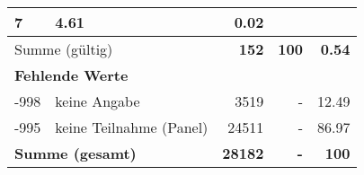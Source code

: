 \begin{longtable}{lXrrr}
       \num{7} &
       \num[round-mode=places,round-precision=2]{4.61} &
         \num[round-mode=places,round-precision=2]{0.02} \\
     \midrule
     \multicolumn{2}{l}{Summe (gültig)} &
       \textbf{\num{152}} &
     \textbf{100} &
       \textbf{\num[round-mode=places,round-precision=2]{0.54}} \\
     \multicolumn{5}{l}{\textbf{Fehlende Werte}}\\
       -998 &
       keine Angabe &
         \num{3519} &
        - &
         \num[round-mode=places,round-precision=2]{12.49} \\
       -995 &
       keine Teilnahme (Panel) &
         \num{24511} &
        - &
         \num[round-mode=places,round-precision=2]{86.97} \\
     \midrule
     \multicolumn{2}{l}{\textbf{Summe (gesamt)}} &
          \textbf{\num{28182}} &
        \textbf{-} &
        \textbf{100} \\
     \bottomrule
     \end{longtable}
     
